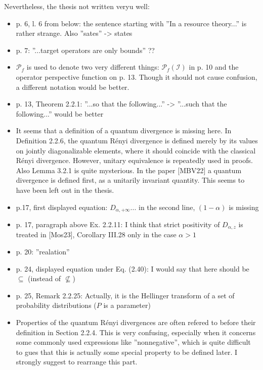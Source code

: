 \documentclass[12pt]{article}
\begin{document}
Nevertheless, the thesis not written veryu well:
\begin{itemize}
\item p. 6, l. 6 from below: the sentence starting with ''In a resource theory...'' is
rather strange. Also ''sates'' -> states
\item p. 7: ''...target operators are only bounds'' ??
\item $\mathcal P_f$ is used to denote two very different things: $\mathcal P_f(\mathcal
I)$ in p. 10 and  the  operator perspective function  on p. 13. Though it should not cause
confusion, a different notation would be better.

\item p. 13, Theorem 2.2.1: ''...so that the following...'' ->  ''...such that the
following...'' would be better

\item It seems that a definition of a quantum divergence  is missing here.
In Definition 2.2.6, the quantum R\'enyi divergence is defined merely by its
values on jointly diagonalizable elements, where it should coincide with the classical
R\'enyi divergence. However, unitary equivalence is repeatedly used in proofs. Also Lemma
3.2.1 is quite mysterious.  In the paper [MBV22] a quantum divergence is defined first, as a unitarily
invariant quantity. This seems to have been left out in the thesis.

\item p.17, first displayed equation: $D_{\alpha,+\infty}...$ in the second line,
$(1-\alpha)$ is missing

\item p. 17, paragraph above Ex. 2.2.11: I think that strict positivity of $D_{\alpha,z}$
is treated in [Mos23], Corollary III.28 only in the case $\alpha>1$

\item p. 20: ''realation''

\item p. 24, displayed equation under Eq. (2.40): I would say that here should be
$\subseteq$ (instead of $\not\subseteq$)


\item p. 25, Remark 2.2.25: Actually, it is the Hellinger transform of a set of
probability distributions ($P$ is a parameter)


\item Properties of the quantum R\'enyi divergences are often refered to before their
definition in Section 2.2.4. This is very  confusing, especially when it concerns some
commonly used expressions  like ''nonnegative'', which is quite difficult to gues  that
this is actually  some special property to be defined later.  I strongly suggest to rearrange this part. 


\end{itemize}
\end{document}
